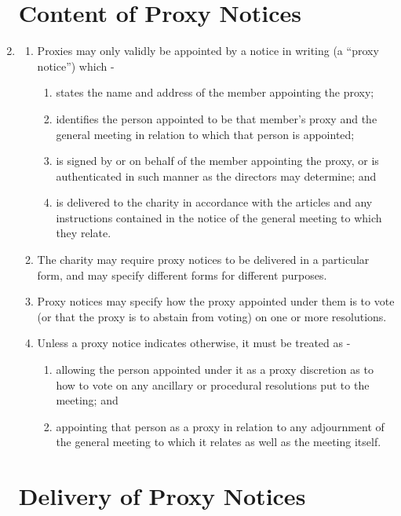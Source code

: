 \begin{enumerate}
\section{Content of Proxy Notices}

\item \label{proxies}
  \begin{enumerate}
  \item
    Proxies may only validly be appointed by a notice in writing (a
    ``proxy notice'') which -
    \begin{enumerate}
    \item
      states the name and address of the member appointing the proxy;
    \item
      identifies the person appointed to be that member's proxy and the
      general meeting in relation to which that person is appointed;
    \item
      is signed by or on behalf of the member appointing the proxy, or is
      authenticated in such manner as the directors may determine; and
    \item
      is delivered to the charity in accordance with the articles and any
      instructions contained in the notice of the general meeting to
      which they relate.
    \end{enumerate}
  \item
    The charity may require proxy notices to be delivered in a
    particular form, and may specify different forms for different
    purposes.
  \item
    Proxy notices may specify how the proxy appointed under them is to
    vote (or that the proxy is to abstain from voting) on one or more
    resolutions.
  \item
    Unless a proxy notice indicates otherwise, it must be treated as -
    \begin{enumerate}
    \item
      allowing the person appointed under it as a proxy discretion as to
      how to vote on any ancillary or procedural resolutions put to the
      meeting; and
    \item
      appointing that person as a proxy in relation to any adjournment of
      the general meeting to which it relates as well as the meeting
      itself.
    \end{enumerate}
  \end{enumerate}

\section{Delivery of Proxy Notices}


\end{enumerate}
